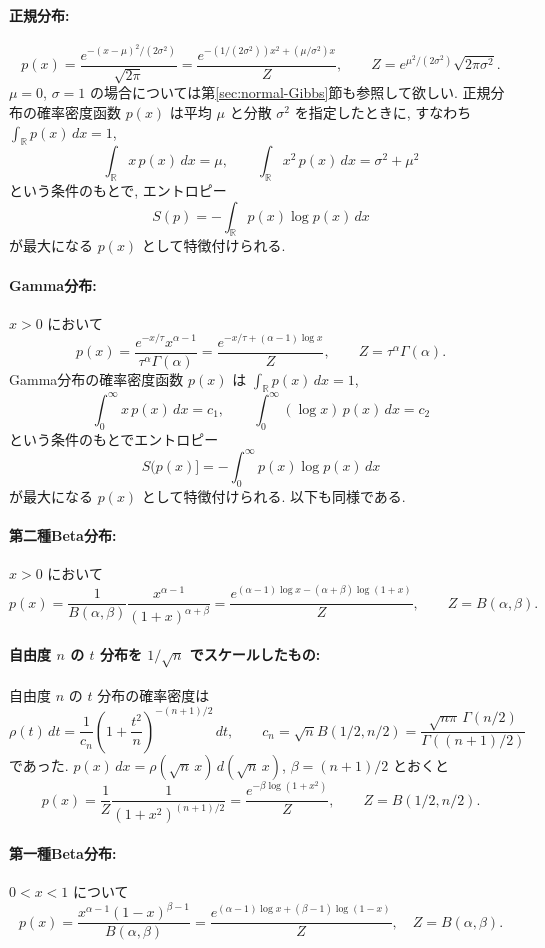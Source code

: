 \documentclass[12pt,twoside]{jarticle}
\newcommand\R{{\mathbb R}} %
\theoremstyle{jplain}
\theoremstyle{jplain}
\theoremstyle{jplain}
\numberwithin{theorem}{section}
\numberwithin{equation}{section}
\numberwithin{figure}{section}
\numberwithin{table}{section}
\newcommand\secref[1]{第\ref{#1}節}
\begin{document}
\paragraph{正規分布:}
\[
p(x) 
= \frac{e^{-(x-\mu)^2/(2\sigma^2)}}{\sqrt{2\pi}}
= \frac{e^{-(1/(2\sigma^2))x^2+(\mu/\sigma^2)x}}{Z},
\qquad Z=e^{\mu^2/(2\sigma^2)}\sqrt{2\pi\sigma^2}.
\]
$\mu=0$, $\sigma=1$ の場合については\secref{sec:normal-Gibbs}も参照して欲しい.
正規分布の確率密度函数 $p(x)$ は平均 $\mu$ と分散 $\sigma^2$ を指定したときに, 
すなわち $\int_\R p(x)\,dx=1$, 
\[
\int_\R x\,p(x)\,dx=\mu, \qquad
\int_\R x^2\,p(x)\,dx = \sigma^2+\mu^2
\]
という条件のもとで, エントロピー
\[
S(p) = -\int_\R p(x)\log p(x)\,dx
\]
が最大になる $p(x)$ として特徴付けられる.

\paragraph{Gamma分布:} $x>0$ において
\[
p(x)=\frac{e^{-x/\tau}x^{\alpha-1}}{\tau^{\alpha}\Gamma(\alpha)}
=\frac{e^{-x/\tau+(\alpha-1)\log x}}{Z}, 
\qquad
Z=\tau^{\alpha}\Gamma(\alpha).
\]
Gamma分布の確率密度函数 $p(x)$ は $\int_\R p(x)\,dx=1$, 
\[
\int_0^\infty x\,p(x)\,dx=c_1, \qquad
\int_0^\infty (\log x)\, p(x)\,dx = c_2
\]
という条件のもとでエントロピー
\[
S(p(x)] = - \int_0^\infty p(x)\log p(x)\,dx
\]
が最大になる $p(x)$ として特徴付けられる. 以下も同様である.

\paragraph{第二種Beta分布:} $x>0$ において
\[
p(x)
=\frac{1}{B(\alpha,\beta)}\frac{x^{\alpha-1}}{(1+x)^{\alpha+\beta}}
=\frac{e^{(\alpha-1)\log x-(\alpha+\beta)\log(1+x)}}{Z},
\qquad
Z=B(\alpha,\beta).
\]

\paragraph{自由度 $n$ の $t$ 分布を $1/\sqrt{n}$ でスケールしたもの:}
自由度 $n$ の $t$ 分布の確率密度は
\[
\rho(t)\,dt
=
\frac{1}{c_n} \left(1+\frac{t^2}{n}\right)^{-(n+1)/2}\,dt,
\qquad
c_n=\sqrt{n}B(1/2,n/2)
=\frac{\sqrt{n\pi}\,\Gamma(n/2)}{\Gamma((n+1)/2)}
\]
であった. 
$p(x)\,dx=\rho(\sqrt{n}\,x)\,d(\sqrt{n}\,x)$, $\beta=(n+1)/2$ とおくと
\[
p(x)
=\frac{1}{Z}\frac{1}{(1+x^2)^{(n+1)/2}}
=\frac{e^{-\beta\log(1+x^2)}}{Z}, 
\qquad
Z=B(1/2,n/2).
\]

\paragraph{第一種Beta分布:} $0<x<1$ について
\[
p(x)
=\frac{x^{\alpha-1}(1-x)^{\beta-1}}{B(\alpha,\beta)}
=\frac{e^{(\alpha-1)\log x+(\beta-1)\log(1-x)}}{Z},
\quad
Z=B(\alpha,\beta).
\]
\end{document}
